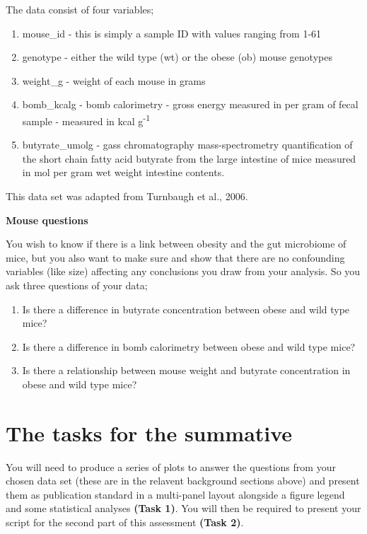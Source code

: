 \documentclass[
]{book}
\providecommand{\tightlist}{%
  \setlength{\itemsep}{0pt}\setlength{\parskip}{0pt}}
\begin{document}
The data consist of four variables;

\begin{enumerate}
\def\labelenumi{\arabic{enumi})}
\tightlist
\item
  mouse\_id - this is simply a sample ID with values ranging from 1-61
\item
  genotype - either the wild type (wt) or the obese (ob) mouse genotypes
\item
  weight\_g - weight of each mouse in grams
\item
  bomb\_kcalg - bomb calorimetry - gross energy measured in per gram of fecal sample - measured in kcal g\textsuperscript{-1}
\item
  butyrate\_umolg - gass chromatography mass-spectrometry quantification of the short chain fatty acid butyrate from the large intestine of mice measured in \mu mol per gram wet weight intestine contents.
\end{enumerate}

This data set was adapted from Turnbaugh et al., 2006.

\textbf{Mouse questions}

You wish to know if there is a link between obesity and the gut microbiome of mice, but you also want to make sure and show that there are no confounding variables (like size) affecting any conclusions you draw from your analysis. So you ask three questions of your data;

\begin{enumerate}
\def\labelenumi{\arabic{enumi})}
\tightlist
\item
  Is there a difference in butyrate concentration between obese and wild type mice?
\item
  Is there a difference in bomb calorimetry between obese and wild type mice?
\item
  Is there a relationship between mouse weight and butyrate concentration in obese and wild type mice?
\end{enumerate}

\section{The tasks for the summative}\label{the-tasks-for-the-summative}

You will need to produce a series of plots to answer the questions from your chosen data set (these are in the relavent background sections above) and present them as publication standard in a multi-panel layout alongside a figure legend and some statistical analyses \textbf{(Task 1)}. You will then be required to present your script for the second part of this assessment \textbf{(Task 2)}.
\end{document}
